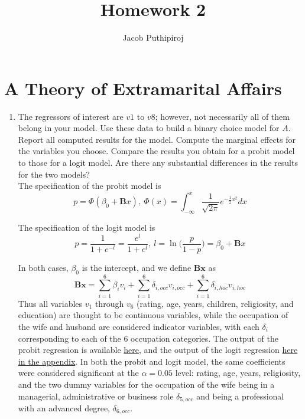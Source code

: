 \documentclass{article}
\begin{document}
\title{\vspace{-2.0cm}Homework 2}
\author{Jacob Puthipiroj}
\maketitle


\section{A Theory of Extramarital Affairs}

\begin{enumerate}[label=(\alph*)]
\item The regressors of interest are $v1$ to $v8$; however, not necessarily all of them belong in your model. Use these data to build a binary choice model for $A$. Report all computed results for the model. Compute the marginal effects for the variables you choose. Compare the results you obtain for a probit model to those for a logit model. Are there any substantial differences in the results for the two models?\\

The specification of the probit model is 
$$ p = \Phi(\beta_0 + \textbf{B}x), \ \Phi(x) = \int_{-\infty}^x \frac{1}{\sqrt{2 \pi } } e^{-\frac{1}{2}x^2} dx$$


The specification of the logit model is 
$$ p = \frac{1}{1+e^{-l}} = \frac{e^l}{1 + e^l}, \ l = \ln \Big( \frac{p}{1-p} \Big) = \beta_0 + \textbf{B}x$$

In both cases, $\beta_0$ is the intercept, and we define $\textbf{Bx}$ as
$$ \textbf{B}\textbf{x} = \sum_{i=1}^6\beta_i v_i + \sum_{i=1}^6\delta_{i,occ} v_{i,occ} +\sum_{i=1}^6 \delta_{i,hoc} v_{i,hoc}$$
Thus all variables $v_1$ through $v_6$ (rating, age, years, children, religiosity, and education) are thought to be continuous variables, while the occupation of the wife and husband are considered indicator variables, with each $\delta_i$ corresponding to each of the 6 occupation categories. The output of the probit regression is available \hyperlink{probitoutput}{here}, and the output of the logit regression \hyperlink{logitoutput}{here in the appendix}. In both the probit and logit model, the same coefficients were considered significant at the $\alpha = 0.05$ level: rating, age, years, religiosity,  and the two dummy variables for the occupation of the wife being in a managerial, administrative or business role $\delta_{5, occ}$ and being a professional with an advanced degree, $\delta_{6,occ}$.\\ 


\end{enumerate}
\end{document}
